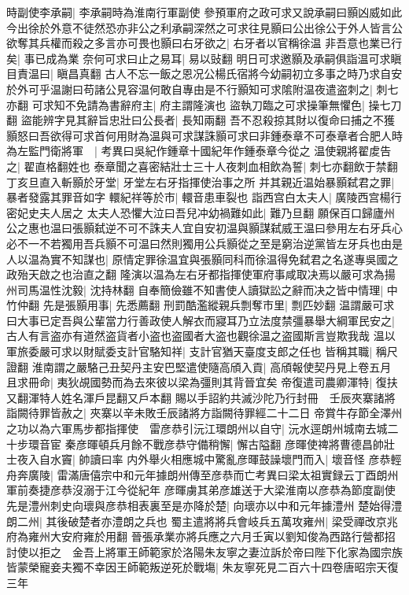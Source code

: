 時副使李承嗣|{
	李承嗣時為淮南行軍副使}
參預軍府之政可求又說承嗣曰顥凶威如此今出徐於外意不徒然恐亦非公之利承嗣深然之可求往見顥曰公出徐公于外人皆言公欲奪其兵權而殺之多言亦可畏也顥曰右牙欲之|{
	右牙者以官稱徐温}
非吾意也業已行矣|{
	事已成為業}
奈何可求曰止之易耳|{
	易以䜴翻}
明日可求邀顥及承嗣俱詣温可求瞋目責温曰|{
	瞋昌真翻}
古人不忘一飯之恩况公楊氏宿將今幼嗣初立多事之時乃求自安於外可乎温謝曰苟諸公見容温何敢自專由是不行顥知可求隂附温夜遣盗刺之|{
	刺七亦翻}
可求知不免請為書辭府主|{
	府主謂隆演也}
盜執刀臨之可求操筆無懼色|{
	操七刀翻}
盜能辨字見其辭旨忠壯曰公長者|{
	長知兩翻}
吾不忍殺掠其財以復命曰捕之不獲顥怒曰吾欲得可求首何用財為温與可求謀誅顥可求曰非鍾泰章不可泰章者合肥人時為左監門衛將軍　|{
	考異曰吳紀作鍾章十國紀年作鍾泰章今從之}
温使親將翟䖍告之|{
	翟直格翻姓也}
泰章聞之喜密結壯士三十人夜刺血相飲為誓|{
	刺七亦翻飲于禁翻}
丁亥旦直入斬顥於牙堂|{
	牙堂左右牙指揮使治事之所}
并其親近温始暴顥弑君之罪|{
	暴者發露其罪音如字}
轘紀祥等於市|{
	轘音患車裂也}
詣西宫白太夫人|{
	廣陵西宫楊行密妃史夫人居之}
太夫人恐懼大泣曰吾兒冲幼禍難如此|{
	難乃旦翻}
願保百口歸廬州公之惠也温曰張顥弑逆不可不誅夫人宜自安初温與顥謀弑威王温曰參用左右牙兵心必不一不若獨用吾兵顥不可温曰然則獨用公兵顥從之至是窮治逆黨皆左牙兵也由是人以温為實不知謀也|{
	原情定罪徐温宜與張顥同科而徐温得免弑君之名遂專吳國之政殆天啟之也治直之翻}
隆演以温為左右牙都指揮使軍府事咸取决焉以嚴可求為揚州司馬温性沈毅|{
	沈持林翻}
自奉簡儉雖不知書使人讀獄訟之辭而决之皆中情理|{
	中竹仲翻}
先是張顥用事|{
	先悉薦翻}
刑罰酷濫縱親兵剽奪市里|{
	剽匹妙翻}
温謂嚴可求曰大事已定吾與公輩當力行善政使人解衣而寢耳乃立法度禁彊暴舉大綱軍民安之|{
	古人有言盗亦有道然盗貨者小盗也盗國者大盗也觀徐温之盗國斯言豈欺我哉}
温以軍旅委嚴可求以財賦委支計官駱知祥|{
	支計官猶天臺度支郎之任也}
皆稱其職|{
	稱尺證翻}
淮南謂之嚴駱己丑契丹主安巴堅遣使隨高頎入貢|{
	高頎報使契丹見上卷五月}
且求冊命|{
	夷狄覘國勢而為去來彼以梁為彊則其背晉宜矣}
帝復遣司農卿渾特|{
	復扶又翻渾特人姓名渾戶昆翻又戶本翻}
賜以手詔約共滅沙陀乃行封冊　壬辰夾寨諸將詣闕待罪皆赦之|{
	夾寨以辛未敗壬辰諸將方詣闕待罪經二十二日}
帝賞牛存節全澤州之功以為六軍馬步都指揮使　雷彦恭引沅江環朗州以自守|{
	沅水逕朗州城南去城二十步環音宦}
秦彦暉頓兵月餘不戰彦恭守備稍懈|{
	懈古隘翻}
彦暉使禆將曹德昌帥壯士夜入自水竇|{
	帥讀曰率}
内外舉火相應城中驚亂彦暉鼓譟壞門而入|{
	壞音怪}
彦恭輕舟奔廣陵|{
	雷滿唐僖宗中和元年據朗州傳至彦恭而亡考異曰梁太祖實録云丁酉朗州軍前奏捷彦恭沒溺于江今從紀年}
彦暉虜其弟彦雄送于大梁淮南以彦恭為節度副使先是澧州刺史向瓌與彦恭相表裏至是亦降於楚|{
	向瓌亦以中和元年據澧州}
楚始得澧朗二州|{
	其後破楚者亦澧朗之兵也}
蜀主遣將將兵會岐兵五萬攻雍州|{
	梁受禪改京兆府為雍州大安府雍於用翻}
晉張承業亦將兵應之六月壬寅以劉知俊為西路行營都招討使以拒之　金吾上將軍王師範家於洛陽朱友寧之妻泣訴於帝曰陛下化家為國宗族皆蒙榮寵妾夫獨不幸因王師範叛逆死於戰塲|{
	朱友寧死見二百六十四卷唐昭宗天復三年}
